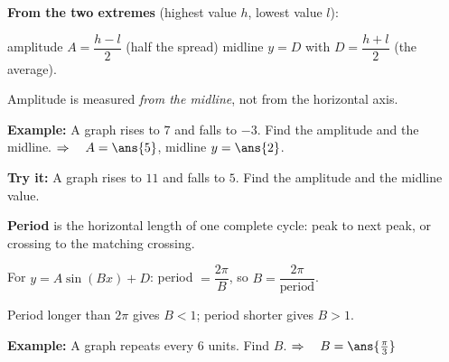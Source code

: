 \documentclass[12pt]{article}
\begin{document}


\begin{formulabox}
\textbf{From the two extremes} (highest value $h$, lowest value $l$):\par
amplitude $A = \dfrac{h - l}{2}$ \quad (half the spread) \qquad midline $y = D$ with $D = \dfrac{h + l}{2}$ \quad (the average).\par
Amplitude is measured \emph{from the midline}, not from the horizontal axis.
\end{formulabox}

\begin{examplebox}
\textbf{Example:} \quad A graph rises to $7$ and falls to $-3$. Find the amplitude and the midline.
$\Rightarrow\quad A = \ans{5}$, \quad midline $y = \ans{2}$.
\end{examplebox}

\begin{tryitbox}
\textbf{Try it:} \quad A graph rises to $11$ and falls to $5$. Find the amplitude and the midline value.\\[2pt]
\end{tryitbox}


\begin{formulabox}
\textbf{Period} is the horizontal length of one complete cycle: peak to next peak, or crossing to the matching crossing.\par
For $y = A\sin(Bx) + D$: \quad period $= \dfrac{2\pi}{B}$, \quad so \quad $B = \dfrac{2\pi}{\text{period}}$.\par
Period longer than $2\pi$ gives $B < 1$; period shorter gives $B > 1$.
\end{formulabox}

\begin{examplebox}
\textbf{Example:} \quad A graph repeats every $6$ units. Find $B$.
$\Rightarrow\quad B = \ans{\tfrac{\pi}{3}}$
\end{examplebox}
\end{document}
